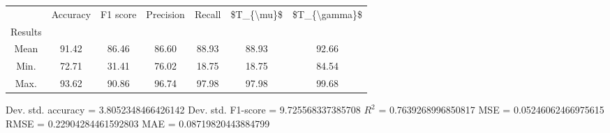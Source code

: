 \begin{tabular}{|c|c|c|c|c|c|c|}
\toprule
{} &  Accuracy &  F1 score &  Precision &  Recall &  \$T\_\{\textbackslash mu\}\$ &  \$T\_\{\textbackslash gamma\}\$ \\
Results &           &           &            &         &            &               \\
\hline
Mean    &     91.42 &     86.46 &      86.60 &   88.93 &      88.93 &         92.66 \\
Min.    &     72.71 &     31.41 &      76.02 &   18.75 &      18.75 &         84.54 \\
Max.    &     93.62 &     90.86 &      96.74 &   97.98 &      97.98 &         99.68 \\
\bottomrule
\end{tabular}

 Dev. std. accuracy = 3.8052348466426142
 Dev. std. F1-score = 9.725568337385708
 $R^2$ = 0.7639268996850817
 MSE = 0.05246062466975615
 RMSE = 0.22904284461592803
 MAE = 0.08719820443884799